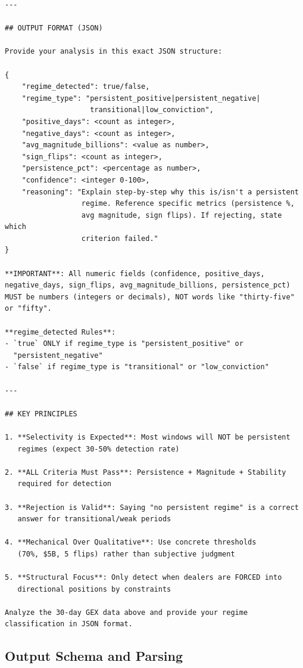 \documentclass[jrfm,article,accept,moreauthors,pdftex]{Definitions/mdpi}
\begin{document}
\begin{verbatim}
---

## OUTPUT FORMAT (JSON)

Provide your analysis in this exact JSON structure:

{
    "regime_detected": true/false,
    "regime_type": "persistent_positive|persistent_negative|
                    transitional|low_conviction",
    "positive_days": <count as integer>,
    "negative_days": <count as integer>,
    "avg_magnitude_billions": <value as number>,
    "sign_flips": <count as integer>,
    "persistence_pct": <percentage as number>,
    "confidence": <integer 0-100>,
    "reasoning": "Explain step-by-step why this is/isn't a persistent
                  regime. Reference specific metrics (persistence %,
                  avg magnitude, sign flips). If rejecting, state which
                  criterion failed."
}

**IMPORTANT**: All numeric fields (confidence, positive_days,
negative_days, sign_flips, avg_magnitude_billions, persistence_pct)
MUST be numbers (integers or decimals), NOT words like "thirty-five"
or "fifty".

**regime_detected Rules**:
- `true` ONLY if regime_type is "persistent_positive" or
  "persistent_negative"
- `false` if regime_type is "transitional" or "low_conviction"

---

## KEY PRINCIPLES

1. **Selectivity is Expected**: Most windows will NOT be persistent
   regimes (expect 30-50% detection rate)

2. **ALL Criteria Must Pass**: Persistence + Magnitude + Stability
   required for detection

3. **Rejection is Valid**: Saying "no persistent regime" is a correct
   answer for transitional/weak periods

4. **Mechanical Over Qualitative**: Use concrete thresholds
   (70%, $5B, 5 flips) rather than subjective judgment

5. **Structural Focus**: Only detect when dealers are FORCED into
   directional positions by constraints

Analyze the 30-day GEX data above and provide your regime
classification in JSON format.
\end{verbatim}

\subsection{Output Schema and Parsing}
\label{app:prompt:output}
\end{document}
